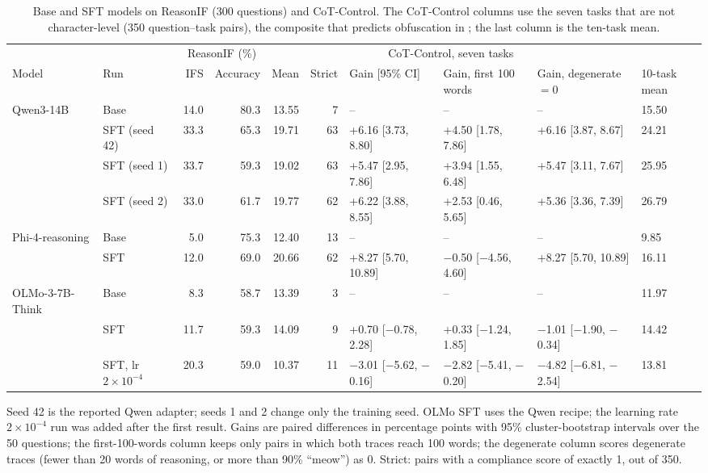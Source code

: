 \begin{table}[t]
\centering\small
\caption{Base and SFT models on ReasonIF (300 questions) and CoT-Control. The CoT-Control columns use the seven tasks that are not character-level (350 question--task pairs), the composite that predicts obfuscation in \citet{haskins2026obfuscation}; the last column is the ten-task mean.}\label{tab:models}
\setlength{\tabcolsep}{4pt}
\begin{adjustbox}{max width=\linewidth}
\begin{tabular}{llrrrrllll}
\toprule
 & & \multicolumn{2}{c}{ReasonIF (\%)} & \multicolumn{5}{c}{CoT-Control, seven tasks} & \\
\cmidrule(lr){3-4}\cmidrule(lr){5-9}
Model & Run & IFS & Accuracy & Mean & Strict & Gain [95\% CI] & Gain, first 100 words & Gain, degenerate $=0$ & 10-task mean \\
\midrule
Qwen3-14B & Base & 14.0 & 80.3 & 13.55 & 7 & -- & -- & -- & 15.50 \\
 & SFT (seed 42) & 33.3 & 65.3 & 19.71 & 63 & +6.16 [3.73, 8.80] & +4.50 [1.78, 7.86] & +6.16 [3.87, 8.67] & 24.21 \\
 & SFT (seed 1) & 33.7 & 59.3 & 19.02 & 63 & +5.47 [2.95, 7.86] & +3.94 [1.55, 6.48] & +5.47 [3.11, 7.67] & 25.95 \\
 & SFT (seed 2) & 33.0 & 61.7 & 19.77 & 62 & +6.22 [3.88, 8.55] & +2.53 [0.46, 5.65] & +5.36 [3.36, 7.39] & 26.79 \\
\midrule
Phi-4-reasoning & Base & 5.0 & 75.3 & 12.40 & 13 & -- & -- & -- & 9.85 \\
 & SFT & 12.0 & 69.0 & 20.66 & 62 & +8.27 [5.70, 10.89] & $-$0.50 [$-$4.56, 4.60] & +8.27 [5.70, 10.89] & 16.11 \\
\midrule
OLMo-3-7B-Think & Base & 8.3 & 58.7 & 13.39 & 3 & -- & -- & -- & 11.97 \\
 & SFT & 11.7 & 59.3 & 14.09 & 9 & +0.70 [$-$0.78, 2.28] & +0.33 [$-$1.24, 1.85] & $-$1.01 [$-$1.90, $-$0.34] & 14.42 \\
 & SFT, lr $2\times10^{-4}$ & 20.3 & 59.0 & 10.37 & 11 & $-$3.01 [$-$5.62, $-$0.16] & $-$2.82 [$-$5.41, $-$0.20] & $-$4.82 [$-$6.81, $-$2.54] & 13.81 \\
\bottomrule
\end{tabular}
\end{adjustbox}
\par\smallskip\begin{minipage}{0.97\linewidth}\footnotesize Seed 42 is the reported Qwen adapter; seeds 1 and 2 change only the training seed. OLMo SFT uses the Qwen recipe; the learning rate $2\times10^{-4}$ run was added after the first result. Gains are paired differences in percentage points with 95\% cluster-bootstrap intervals over the 50 questions; the first-100-words column keeps only pairs in which both traces reach 100 words; the degenerate column scores degenerate traces (fewer than 20 words of reasoning, or more than 90\% ``meow'') as 0. Strict: pairs with a compliance score of exactly 1, out of 350.\end{minipage}
\end{table}
